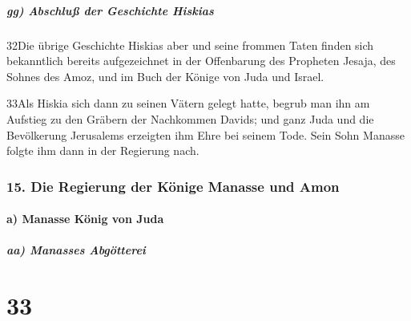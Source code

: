 \hypertarget{gg-abschluuxdf-der-geschichte-hiskias}{%
\subparagraph{gg) Abschluß der Geschichte
Hiskias}\label{gg-abschluuxdf-der-geschichte-hiskias}}

32Die übrige Geschichte Hiskias aber und seine frommen Taten finden sich
bekanntlich bereits aufgezeichnet in der Offenbarung des Propheten
Jesaja, des Sohnes des Amoz, und im Buch der Könige von Juda und Israel.

33Als Hiskia sich dann zu seinen Vätern gelegt hatte, begrub man ihn am
Aufstieg zu den Gräbern der Nachkommen Davids; und ganz Juda und die
Bevölkerung Jerusalems erzeigten ihm Ehre bei seinem Tode. Sein Sohn
Manasse folgte ihm dann in der Regierung nach.

\hypertarget{die-regierung-der-kuxf6nige-manasse-und-amon}{%
\subsubsection{15. Die Regierung der Könige Manasse und
Amon}\label{die-regierung-der-kuxf6nige-manasse-und-amon}}

\hypertarget{a-manasse-kuxf6nig-von-juda}{%
\paragraph{a) Manasse König von
Juda}\label{a-manasse-kuxf6nig-von-juda}}

\hypertarget{aa-manasses-abguxf6tterei}{%
\subparagraph{aa) Manasses Abgötterei}\label{aa-manasses-abguxf6tterei}}

\hypertarget{section-32}{%
\section{33}\label{section-32}}

